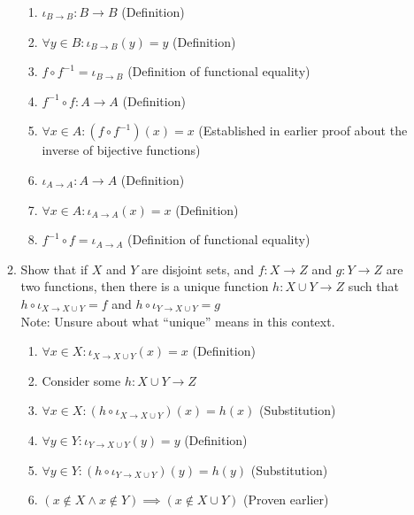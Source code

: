 \documentclass{article}
\begin{document}
\begin{enumerate}
\begin{enumerate}
\begin{enumerate}
                        \item ${\iota}_{B \rightarrow B} : B \rightarrow B$ (Definition)
                        \item $\forall y \in B: {\iota}_{B \rightarrow B}(y) = y$ (Definition)
                        \item $f \circ f^{-1} = {\iota}_{B \rightarrow B}$ (Definition of functional equality)
                        \item $f^{-1} \circ f : A \rightarrow A$ (Definition)
                        \item $\forall x \in A: (f \circ f^{-1})(x) = x$ (Established in earlier proof about the inverse of bijective functions)
                        \item ${\iota}_{A \rightarrow A} : A \rightarrow A$ (Definition)
                        \item $\forall x \in A: {\iota}_{A \rightarrow A}(x) = x$ (Definition)
                        \item $f^{-1} \circ f = {\iota}_{A \rightarrow A}$ (Definition of functional equality)
                    \end{enumerate}
                \item Show that if $X$ and $Y$ are disjoint sets, and $f : X
                    \rightarrow Z$ and $g : Y \rightarrow Z$ are two functions,
                    then there is a unique function $h : X \cup Y \rightarrow
                    Z$ such that $h \circ {\iota}_{X \rightarrow X \cup Y} = f$
                    and $h \circ {\iota}_{Y \rightarrow X \cup Y} = g$ \\
                    Note: Unsure about what ``unique'' means in this context.
                    \begin{enumerate}
                        \item $\forall x \in X: {\iota}_{X \rightarrow X \cup Y}(x) = x$ (Definition)
                        \item Consider some $h: X \cup Y \rightarrow Z$
                        \item $\forall x \in X: (h \circ {\iota}_{X \rightarrow X \cup Y})(x) = h(x)$ (Substitution)
                        \item $\forall y \in Y: {\iota}_{Y \rightarrow X \cup Y}(y) = y$ (Definition)
                        \item $\forall y \in Y: (h \circ {\iota}_{Y \rightarrow X \cup Y})(y) = h(y)$ (Substitution)
                        \item $(x \notin X \land x \notin Y) \implies (x \notin X \cup Y)$ (Proven earlier)

\end{enumerate}
\end{enumerate}
\end{enumerate}
\end{document}
